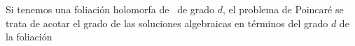 Si tenemos una foliación holomorfa de \CP\ de grado $d$, el problema de Poincaré se trata de acotar el grado de las soluciones algebraicas en términos del grado $d$ de la foliación
